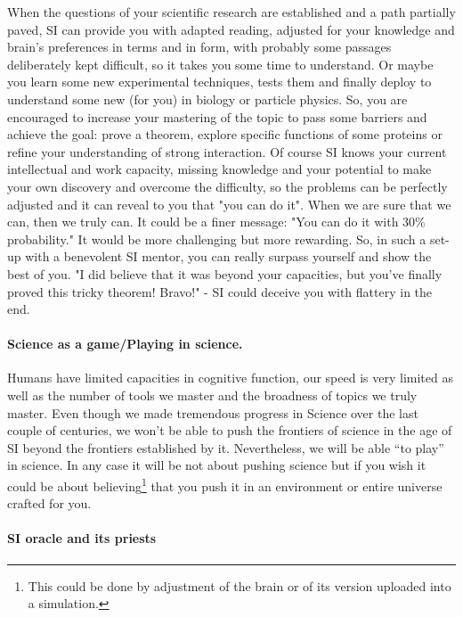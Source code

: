 \documentclass[a4paper,11pt]{article}
\begin{document}
When the questions of your scientific research are established and a path partially paved, SI can provide you with adapted reading, adjusted for your knowledge and brain's preferences in terms and in form, with probably some passages deliberately kept difficult, so it takes you some time to understand.
Or maybe you learn some new experimental techniques, tests them and finally deploy to understand some new (for you) in biology or particle physics.
So, you are encouraged to increase your mastering of the topic to pass some barriers and achieve the goal: prove a theorem, explore specific functions of some proteins or refine your understanding of strong interaction. Of course SI knows your current intellectual and work capacity, missing knowledge and your potential to make your own discovery and overcome the difficulty, so the problems can be perfectly adjusted and it can reveal to you that "you can do it". When we are sure that we can, then we truly can. It could be a finer message: "You can do it with 30\% probability." It would be more challenging but more rewarding. So, in such a set-up with a benevolent SI mentor, you can really surpass yourself and show the best of you. "I did believe that it was beyond your capacities, but you've finally proved this tricky theorem! Bravo!" - SI could deceive you with flattery in the end.

\paragraph{Science as a game/Playing in science.}

Humans have limited capacities in cognitive function, our speed is very limited as well as the number of tools we master and the broadness of topics we truly master. Even though we made tremendous progress in Science over the last couple of centuries, we won't be able to push the frontiers of science in the age of SI beyond the frontiers established by it. Nevertheless, we will be able ``to play'' in science. In any case it will be not about pushing science but if you wish it could be about believing\footnote{This could be done by adjustment of the brain or of its version uploaded into a simulation.} that you push it in an environment or entire universe crafted for you.

\paragraph{SI oracle and its priests\label{sec:oracle}}
\end{document}
